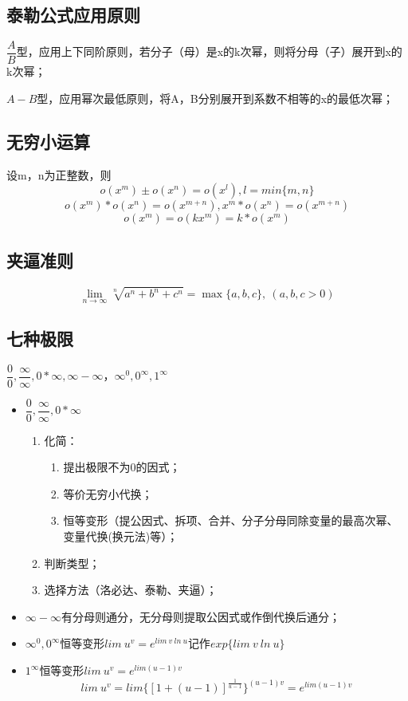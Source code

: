 \subsection{泰勒公式应用原则}

\(\dfrac{A}{B}\)型，应用上下同阶原则，若分子（母）是x的k次幂，则将分母（子）展开到x的k次幂；

\(A - B\)型，应用幂次最低原则，将A，B分别展开到系数不相等的x的最低次幂；





\subsection{无穷小运算}
设m，n为正整数，则
\[o(x^m) \pm o(x^n) = o(x^l), l = min\{m, n\}\]
\[o(x^m) * o(x^n) = o(x^{m + n}), x^m * o(x^n) = o(x^{m + n})\]
\[o(x^m) = o(kx^m) = k*o(x^m)\]


\subsection{夹逼准则}

\[\lim_{n \to \infty}\sqrt[n]{a^n + b^n + c^n} = \max\{a, b, c\},\ (a, b, c > 0)\]

\subsection{七种极限}
\(\dfrac{0}{0}, \dfrac{\infty}{\infty}, 0 * \infty, \infty - \infty， \infty^0, 0^{\infty}, 1^{\infty}\)

\begin{itemize}
    \item \(\dfrac{0}{0}, \dfrac{\infty}{\infty}, 0 * \infty\)\begin{enumerate}
        \item 化简：\begin{enumerate}
            \item 提出极限不为0的因式；
            \item 等价无穷小代换；
            \item 恒等变形（提公因式、拆项、合并、分子分母同除变量的最高次幂、变量代换(换元法)等）；
        \end{enumerate}
        \item 判断类型；
        \item 选择方法（洛必达、泰勒、夹逼）；
    \end{enumerate}
    \item \(\infty - \infty\)有分母则通分，无分母则提取公因式或作倒代换后通分；
    \item \(\infty^0, 0^{\infty}\)恒等变形\(lim\ u^v = e^{lim\ v\ ln\ u} \text{记作}exp\{lim\ v\ ln\ u\}\)
    \item \(1^{\infty}\)恒等变形\(lim\ u^v = e^{lim(u - 1)v}\)
    \[lim\ u^v = lim\{[1 + (u - 1)]^{\frac{1}{u - 1}}\}^{(u - 1)v} = e^{lim(u - 1)v}\]
\end{itemize}





